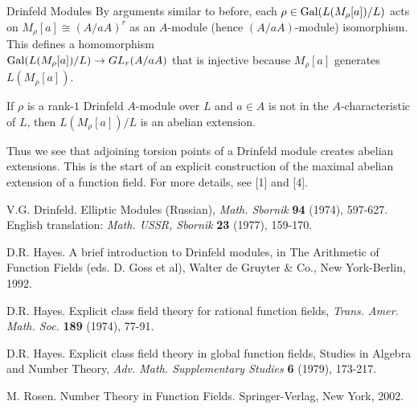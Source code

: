 \documentclass[12pt]{article}
\begin{document}
\begin{section}{Drinfeld Modules}
By arguments similar to before, each $\rho \in \operatorname{Gal}(L(M_\rho[a])/L)$ acts
on $M_\rho[a] \cong (A/aA)^r$ as an $A$-module (hence $(A/aA)$-module)
isomorphism.  This defines a homomorphism \\
$\operatorname{Gal}(L(M_\rho[a])/L) \rightarrow GL_r(A/aA)$ that is injective because
$M_\rho[a]$ generates $L(M_\rho[a])$.
\hamlos

\begin{corollary}
If $\rho$ is a rank-$1$ Drinfeld $A$-module over $L$ and $a \in A$ is not
in the $A$-characteristic of $L$, then $L(M_\rho[a])/L$ is an abelian
extension.
\end{corollary}

Thus we see that adjoining torsion points of a Drinfeld module creates
abelian extensions.  This is the start of an explicit construction of
the maximal abelian extension of a function field.  For more details,
see [1] and [4].

\end{section} %



\begin{thebibliography}{1000}

 V.G. Drinfeld.  Elliptic Modules (Russian), \textit{
Math. Sbornik} {\bf 94} (1974), 597-627.  English translation: \textit{
Math. USSR, Sbornik} {\bf 23} (1977), 159-170.

 D.R. Hayes.  A brief introduction to Drinfeld modules,
in The Arithmetic of Function Fields (eds. D. Goss et al), Walter de
Gruyter \& Co., New York-Berlin, 1992.

 D.R. Hayes.  Explicit class field theory for rational
function fields, \textit{Trans. Amer. Math. Soc.} {\bf 189} (1974), 77-91.

 D.R. Hayes.  Explicit class field theory in global
function fields, Studies in Algebra and Number Theory, \textit{Adv. Math.
Supplementary Studies} {\bf 6} (1979), 173-217.

 M. Rosen.  Number Theory in Function Fields.
Springer-Verlag, New York, 2002.

\end{thebibliography}
\end{document}
